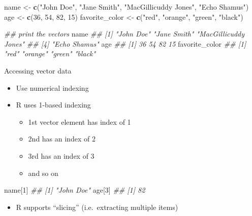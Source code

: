 \documentclass[
]{book}
\newenvironment{Shaded}{\begin{snugshade}}{\end{snugshade}}
\newcommand{\CommentTok}[1]{\textcolor[rgb]{0.56,0.35,0.01}{\textit{#1}}}
\newcommand{\DecValTok}[1]{\textcolor[rgb]{0.00,0.00,0.81}{#1}}
\newcommand{\KeywordTok}[1]{\textcolor[rgb]{0.13,0.29,0.53}{\textbf{#1}}}
\newcommand{\NormalTok}[1]{#1}
\newcommand{\StringTok}[1]{\textcolor[rgb]{0.31,0.60,0.02}{#1}}
\providecommand{\tightlist}{%
  \setlength{\itemsep}{0pt}\setlength{\parskip}{0pt}}
\begin{document}
\begin{Shaded}
\begin{Highlighting}[]
\NormalTok{name <-}\StringTok{ }\KeywordTok{c}\NormalTok{(}\StringTok{"John Doe"}\NormalTok{, }\StringTok{"Jane Smith"}\NormalTok{, }\StringTok{"MacGillicuddy Jones"}\NormalTok{, }\StringTok{"Echo Shamus"}\NormalTok{)}
\NormalTok{age <-}\StringTok{ }\KeywordTok{c}\NormalTok{(}\DecValTok{36}\NormalTok{, }\DecValTok{54}\NormalTok{, }\DecValTok{82}\NormalTok{, }\DecValTok{15}\NormalTok{)}
\NormalTok{favorite_color <-}\StringTok{ }\KeywordTok{c}\NormalTok{(}\StringTok{"red"}\NormalTok{, }\StringTok{"orange"}\NormalTok{, }\StringTok{"green"}\NormalTok{, }\StringTok{"black"}\NormalTok{)}

\CommentTok{## print the vectors}
\NormalTok{name}
\CommentTok{## [1] "John Doe"            "Jane Smith"          "MacGillicuddy Jones"}
\CommentTok{## [4] "Echo Shamus"}
\NormalTok{age}
\CommentTok{## [1] 36 54 82 15}
\NormalTok{favorite_color}
\CommentTok{## [1] "red"    "orange" "green"  "black"}
\end{Highlighting}
\end{Shaded}

Accessing vector data

\begin{itemize}
\tightlist
\item
  Use numerical indexing
\item
  R uses 1-based indexing

  \begin{itemize}
  \tightlist
  \item
    1st vector element has index of 1
  \item
    2nd has an index of 2
  \item
    3rd has an index of 3
  \item
    and so on
  \end{itemize}
\end{itemize}

\begin{Shaded}
\begin{Highlighting}[]
\NormalTok{name[}\DecValTok{1}\NormalTok{]}
\CommentTok{## [1] "John Doe"}
\NormalTok{age[}\DecValTok{3}\NormalTok{]}
\CommentTok{## [1] 82}
\end{Highlighting}
\end{Shaded}

\begin{itemize}
\tightlist
\item
  R supports ``slicing'' (i.e.~extracting multiple items)
\end{itemize}
\end{document}
